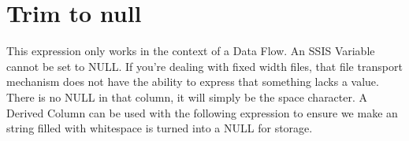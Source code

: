 \section{Trim to null}
\label{sec:Trim to null}
This expression only works in the context of a Data Flow. An SSIS Variable cannot be set to NULL. If you're dealing with fixed width files, that file transport mechanism does not have the ability to express that something lacks a value. There is no NULL in that column, it will simply be the space character. A Derived Column can be used with the following expression to ensure we make an string filled with whitespace is turned into a NULL for storage.


